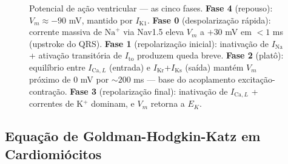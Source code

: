 \begin{figure}[htbp]
\centering
{}
\caption{Potencial de ação ventricular --- as cinco fases. \textbf{Fase 4} (repouso): $V_m \approx -90$ mV, mantido por $I_{\mathrm{K1}}$. \textbf{Fase 0} (despolarização rápida): corrente massiva de $\mathrm{Na}^+$ via Nav1.5 eleva $V_m$ a $+30$ mV em $<1$ ms (upstroke do QRS). \textbf{Fase 1} (repolarização inicial): inativação de $I_{\mathrm{Na}}$ + ativação transitória de $I_{\mathrm{to}}$ produzem queda breve. \textbf{Fase 2} (platô): equilíbrio entre $I_{\mathrm{Ca},L}$ (entrada) e $I_{\mathrm{Kr}}$+$I_{\mathrm{Ks}}$ (saída) mantém $V_m$ próximo de 0 mV por $\sim 200$ ms --- base do acoplamento excitação-contração. \textbf{Fase 3} (repolarização final): inativação de $I_{\mathrm{Ca},L}$ + correntes de K$^+$ dominam, e $V_m$ retorna a $E_K$.}
\label{fig:12-pa}
\end{figure}

\subsection{Equação de Goldman-Hodgkin-Katz em Cardiomiócitos}
\label{sub:image12-ghk}

